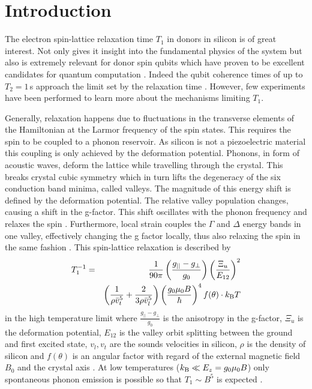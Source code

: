 
\noindent \hrulefill
\clearpage

\normalsize

\section{\label{sec:introduction}Introduction}

The electron spin-lattice relaxation time $T_1$ in donors in silicon is of great interest. Not only gives it insight into the fundamental physics of the system but also is extremely relevant for donor spin qubits which have proven to be excellent candidates for quantum computation \cite{Muhonen2014, Muhonen2015}. Indeed the qubit coherence times of up to $T_2=1\,$s approach the limit set by the relaxation time \cite{Kalra2016}. However, few experiments have been performed to learn more about the mechanisms limiting $T_1$. 

Generally, relaxation happens due to fluctuations in the transverse elements of the Hamiltonian at the Larmor frequency of the spin states. This requires the spin to be coupled to a phonon reservoir.
As silicon is not a piezoelectric material this coupling is only achieved by the deformation potential. Phonons, in form of acoustic waves, deform the lattice while travelling through the crystal. This breaks crystal cubic symmetry which in turn lifts the degeneracy of the six conduction band minima, called valleys. The magnitude of this energy shift is defined by the deformation potential. The relative valley population changes, causing a shift in the g-factor. This shift oscillates with the phonon frequency and relaxes the spin \cite{Hasegawa1960}. Furthermore, local strain couples the $\Gamma$ and $\Delta$ energy bands in one valley, effectively changing the g factor locally, thus also relaxing the spin in the same fashion \cite{Roth1960}. 
This spin-lattice relaxation is described by 
\begin{eqnarray}\label{eq:fullT1}
T_1^{-1} & = & \frac{1}{90\pi}\left(\frac{g_{||}-g_\perp}{g_0}\right)\left(\frac{\Xi_u}{E_{12}}\right)^2\\
& &\left(\frac{1}{\rho \bar{v}_t^5}+\frac{2}{3\rho\bar{v}_l^5}\right)\left(\frac{g_0\mu_0B}{\hbar}\right)^4f(\theta)\cdot k_{\rm B} T
\end{eqnarray}
in the high temperature limit where $\frac{g_{||}-g_\perp}{g_0}$ is the anisotropy in the g-factor, $\Xi_u$ is the deformation potential, $E_{12}$ is the valley orbit splitting between the ground and first excited state, $v_l, v_t$ are the sounds velocities in silicon, $\rho$ is the density of silicon and $f(\theta)$ is an angular factor with regard of the external magnetic field $B_0$ and the crystal axis \cite{Wilson1961}.
At low temperatures ($k_{\rm B}\ll E_z=g_0\mu_0 B$) only spontaneous phonon emission is possible so that $T_1\sim B^5$ is expected \cite{Morello2010, Zwanenburg2013}. 

